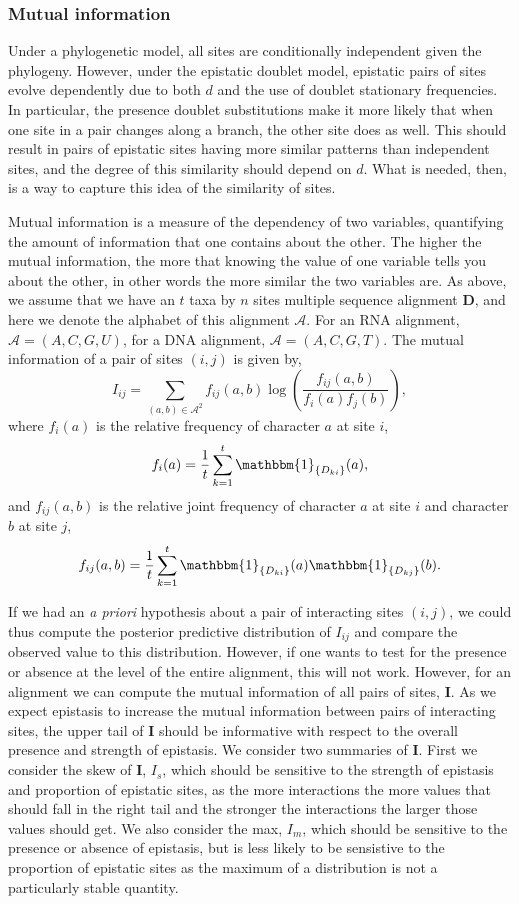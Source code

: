 \documentclass[11pt]{article}
\begin{document}
\subsubsection*{Mutual information\label{sec:mi}}

Under a phylogenetic model, all sites are conditionally independent given the phylogeny.
However, under the epistatic doublet model, epistatic pairs of sites evolve dependently due to both $d$ and the use of doublet stationary frequencies.
In particular, the presence doublet substitutions make it more likely that when one site in a pair changes along a branch, the other site does as well.
This should result in pairs of epistatic sites having more similar patterns than independent sites, and the degree of this similarity should depend on $d$.
What is needed, then, is a way to capture this idea of the similarity of sites.

Mutual information is a measure of the dependency of two variables, quantifying the amount of information that one contains about the other.
The higher the mutual information, the more that knowing the value of one variable tells you about the other, in other words the more similar the two variables are.
As above, we assume that we have an $t$ taxa by $n$ sites multiple sequence alignment $\boldsymbol{D}$, and here we denote the alphabet of this alignment $\mathcal{A}$.
For an RNA alignment, $\mathcal{A} = (A,C,G,U)$, for a DNA alignment, $\mathcal{A} = (A,C,G,T)$.
The mutual information of a pair of sites $(i,j)$ is given by,
\[
I_{ij} = \sum_{(a,b)\in\mathcal{A}^2}f_{ij}(a,b)\log\left(\frac{f_{ij}(a,b)}{f_i(a)f_j(b)}\right),
\]
where $f_i(a)$ is the relative frequency of character $a$ at site $i$,
\[
f_i(a) = \frac{1}{t}\sum_{k=1}^{t}\mathbbm{1}_{\{D_{ki}\}}(a),
\]
and $f_{ij}(a,b)$ is the relative joint frequency of character $a$ at site $i$ and character $b$ at site $j$,
\[
f_{ij}(a,b) = \frac{1}{t}\sum_{k=1}^{t}\mathbbm{1}_{\{D_{ki}\}}(a) \mathbbm{1}_{\{D_{kj}\}}(b).
\]

If we had an \textit{a priori} hypothesis about a pair of interacting sites $(i,j)$, we could thus compute the posterior predictive distribution of $I_{ij}$ and compare the observed value to this distribution.
However, if one wants to test for the presence or absence at the level of the entire alignment, this will not work.
However, for an alignment we can compute the mutual information of all pairs of sites, $\boldsymbol{I}$.
As we expect epistasis to increase the mutual information between pairs of interacting sites, the upper tail of $\boldsymbol{I}$ should be informative with respect to the overall presence and strength of epistasis.
We consider two summaries of $\boldsymbol{I}$.
First we consider the skew of $\boldsymbol{I}$, $I_s$, which should be sensitive to the strength of epistasis and proportion of epistatic sites, as the more interactions the more values that should fall in the right tail and the stronger the interactions the larger those values should get.
We also consider the max, $I_m$, which should be sensitive to the presence or absence of epistasis, but is less likely to be sensistive to the proportion of epistatic sites as the maximum of a distribution is not a particularly stable quantity.
\end{document}
